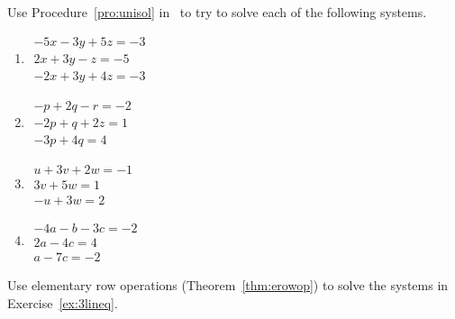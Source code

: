 \begin{exercise} \label{ex:3lineq} 
Use Procedure~\ref{pro:unisol} in \script\ to try to solve each of the following systems.
\begin{enumerate}
\item \(\begin{array}{l}
-5x  -3y   +5z=  -3 \\
   2x   +3y  -z = -5\\
  -2x   +3y   +4z=  -3
\end{array}\)

\item \(\begin{array}{l}
-p   +2q  -r=  -2\\
  -2p   +q   +2z=   1\\
  -3p   +4q=   4\end{array}\)

\item \(\begin{array}{l}
u   +3v   +2w=  -1\\
      3v   +5w=   1\\
  -u      +3w=   2\end{array}\)

\item \(\begin{array}{l}
-4a  -b  -3c=  -2\\
   2a    -4c=   4\\
   a     -7c=  -2\end{array}\)

%
\end{enumerate}
\end{exercise}


\begin{exercise} \label{ex:} 
Use elementary row operations (Theorem~\ref{thm:erowop}) to solve the systems in Exercise~\ref{ex:3lineq}.
\end{exercise}





